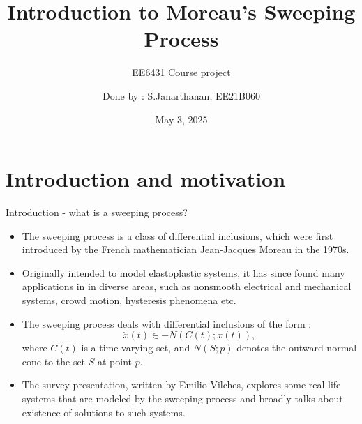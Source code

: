 \documentclass[8pt,aspectratio=169]{beamer}
\title{Introduction to Moreau's Sweeping\\ Process}
\subtitle{EE6431 Course project}
\author{Done by : S.Janarthanan, EE21B060}
\institute[COMP]{IIT Madras}
\date{May 3, 2025}
\begin{document}
\maketitle %

\section{Introduction and motivation}

\begin{frame}{Introduction - what is a sweeping process?}
    \begin{itemize}
        \item The sweeping process is a class of differential inclusions, which were first introduced by the French mathematician Jean-Jacques Moreau in the 1970s.
        \item Originally intended to model elastoplastic systems, it has since found many applications in in diverse areas, such as nonsmooth electrical and mechanical systems, crowd motion, hysteresis phenomena etc.
        \item The sweeping process deals with differential inclusions of the form :
            \begin{equation*}
                \dot{x}(t) \in -N(C(t); x(t)),
            \end{equation*}
            where $C(t)$ is a time varying set, and $N(S; p)$ denotes the outward normal cone to the set $S$ at point $p$.
        \item The survey presentation, written by Emilio Vilches, explores some real life systems that are modeled by the sweeping process and broadly talks about existence of solutions to such systems.
    \end{itemize}
\end{frame}
\end{document}
